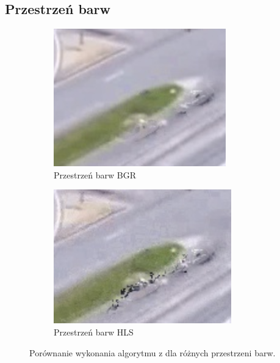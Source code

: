 \subsection{Przestrzeń barw}
\begin{figure}[H]
\centering
\begin{subfigure}{.5\textwidth}
  \centering
  \includegraphics[width=.95\linewidth]{img/bgr-art.png}
  \caption{Przestrzeń barw BGR}
  \label{fig:sub1}
\end{subfigure}%
\begin{subfigure}{.5\textwidth}
  \centering
  \includegraphics[width=.95\linewidth]{img/hls-art.png}
  \caption{Przestrzeń barw HLS}
  \label{fig:sub2}
\end{subfigure}
\caption{Porównanie wykonania algorytmu z dla różnych przestrzeni barw.}
\label{fig:bgrhls}
\end{figure}

